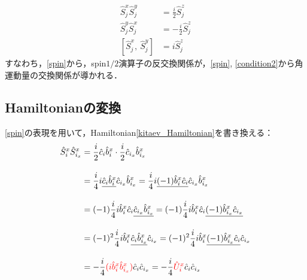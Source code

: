 \documentclass[dvipdfmx,autodetect-engine]{jsarticle}
\newcommand{\nn}{\notag \\}
\begin{document}
\begin{align}
    \hat{S}_j^{x}\hat{S}_j^{y}
    &
    =\frac{i}{2}\hat{S}_j^z\\[10pt]
    \hat{S}_j^{y}\hat{S}_j^{x}
    &
    =-\frac{i}{2}\hat{S}_j^z\\[10pt]
    [\hat{S}_j^{x},\ \hat{S}_j^{y}]
    &
    =i\hat{S}_j^z
\end{align}
すなわち，\eqref{spin}から，spin$1/2$演算子の反交換関係が，\eqref{spin}, \eqref{condition2}から角運動量の交換関係が導かれる．


\subsection{Hamiltonianの変換}
\eqref{spin}の表現を用いて，Hamiltonian\eqref{kitaev_Hamiltonian}を書き換える：
\begin{align}
    \hat{S}_i^{x}\hat{S}_{i_x}^{x}
    &=\frac{i}{2} \hat{c}_i\hat{b}^{x}_i\cdot
    \frac{i}{2} \hat{c}_{i_x}\hat{b}^{x}_{i_x}\nn[10pt]
    &=\frac{i}{4} i\uline{\hat{c}_i\hat{b}^{x}_i}
    \hat{c}_{i_x}\hat{b}^{x}_{i_x}
    =\frac{i}{4} i\uline{(-1)\hat{b}^{x}_i\hat{c}_i}
    \hat{c}_{i_x}\hat{b}^{x}_{i_x}
    \nn[10pt]
    &
    =(-1)\frac{i}{4} i\hat{b}^{x}_i\hat{c}_i
    \uline{\hat{c}_{i_x}\hat{b}^{x}_{i_x}}
    =(-1)\frac{i}{4} i\hat{b}^{x}_i\hat{c}_i
    \uline{(-1)\hat{b}^{x}_{i_x}\hat{c}_{i_x}}
    \nn[10pt]
    &
    =(-1)^2\frac{i}{4} i\hat{b}^{x}_i
    \uline{\hat{c}_i\hat{b}^{x}_{i_x}}\hat{c}_{i_x}
    =(-1)^2\frac{i}{4} i\hat{b}^{x}_i
    \uline{(-1)\hat{b}^{x}_{i_x}\hat{c}_i}\hat{c}_{i_x}
    \nn[10pt]
    &
    =-\frac{i}{4} \textcolor{red}{(i\hat{b}^{x}_i\hat{b}^{x}_{i_x})}
    \hat{c}_i\hat{c}_{i_x}
    =-\frac{i}{4} \textcolor{red}{\hat{U}_i^{x}}
    \hat{c}_i\hat{c}_{i_x}
\end{align}
\end{document}
